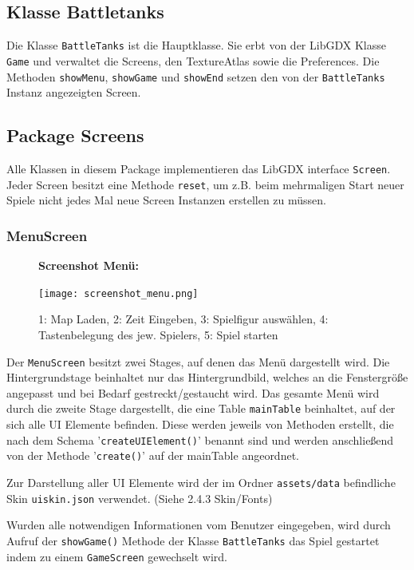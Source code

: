 \documentclass[10pt]{report}
\def\code#1{\texttt{#1}}
\begin{document}
\subsection{Klasse Battletanks}
Die Klasse \code{BattleTanks} ist die Hauptklasse. Sie erbt von der LibGDX Klasse \code{Game} und verwaltet die Screens, den TextureAtlas sowie die Preferences.
Die Methoden \code{showMenu}, \code{showGame} und \code{showEnd} setzen den von der \code{BattleTanks} Instanz angezeigten Screen.

\newpage
\subsection{Package Screens}
Alle Klassen in diesem Package implementieren das LibGDX interface \code{Screen}. Jeder Screen besitzt eine Methode \code{reset}, um z.B. beim mehrmaligen Start neuer Spiele nicht jedes Mal neue Screen Instanzen erstellen zu müssen.
\subsubsection{MenuScreen}
\begin{figure}[H]
  \textbf{Screenshot Menü:}\par\medskip
  \centering
\texttt{[image: screenshot\_menu.png]}
\caption{1: Map Laden, 2: Zeit Eingeben, 3: Spielfigur auswählen, 4: Tastenbelegung des jew. Spielers,
5: Spiel starten}
\end{figure}


Der \code{MenuScreen} besitzt zwei Stages, auf denen das Menü dargestellt wird. Die Hintergrundstage beinhaltet nur das Hintergrundbild, welches an die Fenstergröße angepasst und bei Bedarf gestreckt/gestaucht wird.
Das gesamte Menü wird durch die zweite Stage dargestellt, die eine Table \code{mainTable} beinhaltet, auf der sich alle UI Elemente befinden. Diese werden jeweils von Methoden erstellt, die nach dem Schema '\code{createUIElement()}' benannt sind und werden anschließend von der Methode '\code{create()}' auf der mainTable angeordnet.


Zur Darstellung aller UI Elemente wird der im Ordner \code{assets/data} befindliche Skin \code{uiskin.json} verwendet. (Siehe 2.4.3 Skin/Fonts)

Wurden alle notwendigen Informationen vom Benutzer eingegeben, wird durch Aufruf der \code{showGame()} Methode der Klasse \code{BattleTanks} das Spiel gestartet indem zu einem \code{GameScreen} gewechselt wird.


\newpage
\end{document}

